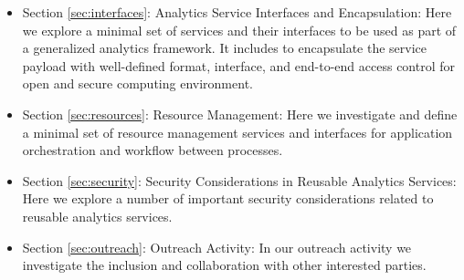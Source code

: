 \begin{itemize}
\item Section \ref{sec:interfaces}: Analytics Service Interfaces and
  Encapsulation: Here we explore a minimal set of services and their
  interfaces to be used as part of a generalized analytics
  framework. It includes to encapsulate the service payload with
  well-defined format, interface, and end-to-end access control for
  open and secure computing environment.
  
\item Section \ref{sec:resources}: Resource Management: Here we
  investigate and define a minimal set of resource management services
  and interfaces for application orchestration and workflow between
  processes.

\item Section \ref{sec:security}: Security Considerations in Reusable
  Analytics Services: Here we explore a number of important security
  considerations related to reusable analytics services.  

\item Section \ref{sec:outreach}: Outreach Activity: In our outreach
  activity we investigate the inclusion and collaboration with other
  interested parties.

\end{itemize}

